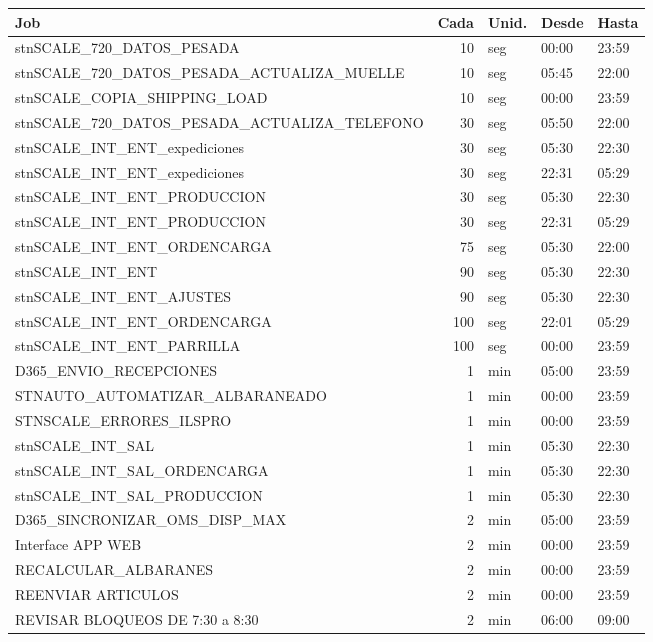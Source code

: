 \documentclass[11pt,a4paper]{article}
\begin{document}
\begin{longtable}{p{8.3cm}rp{1.2cm}p{1.5cm}p{1.5cm}}
\toprule
\textbf{Job} & \textbf{Cada} & \textbf{Unid.} & \textbf{Desde} & \textbf{Hasta} \\
\midrule
\endhead
stnSCALE\_720\_DATOS\_PESADA & 10 & seg & 00:00 & 23:59 \\
stnSCALE\_720\_DATOS\_PESADA\_ACTUALIZA\_MUELLE & 10 & seg & 05:45 & 22:00 \\
stnSCALE\_COPIA\_SHIPPING\_LOAD & 10 & seg & 00:00 & 23:59 \\
stnSCALE\_720\_DATOS\_PESADA\_ACTUALIZA\_TELEFONO & 30 & seg & 05:50 & 22:00 \\
stnSCALE\_INT\_ENT\_expediciones & 30 & seg & 05:30 & 22:30 \\
stnSCALE\_INT\_ENT\_expediciones & 30 & seg & 22:31 & 05:29 \\
stnSCALE\_INT\_ENT\_PRODUCCION & 30 & seg & 05:30 & 22:30 \\
stnSCALE\_INT\_ENT\_PRODUCCION & 30 & seg & 22:31 & 05:29 \\
stnSCALE\_INT\_ENT\_ORDENCARGA & 75 & seg & 05:30 & 22:00 \\
stnSCALE\_INT\_ENT & 90 & seg & 05:30 & 22:30 \\
stnSCALE\_INT\_ENT\_AJUSTES & 90 & seg & 05:30 & 22:30 \\
stnSCALE\_INT\_ENT\_ORDENCARGA & 100 & seg & 22:01 & 05:29 \\
stnSCALE\_INT\_ENT\_PARRILLA & 100 & seg & 00:00 & 23:59 \\
\midrule
D365\_ENVIO\_RECEPCIONES & 1 & min & 05:00 & 23:59 \\
STNAUTO\_AUTOMATIZAR\_ALBARANEADO & 1 & min & 00:00 & 23:59 \\
STNSCALE\_ERRORES\_ILSPRO & 1 & min & 00:00 & 23:59 \\
stnSCALE\_INT\_SAL & 1 & min & 05:30 & 22:30 \\
stnSCALE\_INT\_SAL\_ORDENCARGA & 1 & min & 05:30 & 22:30 \\
stnSCALE\_INT\_SAL\_PRODUCCION & 1 & min & 05:30 & 22:30 \\
D365\_SINCRONIZAR\_OMS\_DISP\_MAX & 2 & min & 05:00 & 23:59 \\
Interface APP WEB & 2 & min & 00:00 & 23:59 \\
RECALCULAR\_ALBARANES & 2 & min & 00:00 & 23:59 \\
REENVIAR ARTICULOS & 2 & min & 00:00 & 23:59 \\
REVISAR BLOQUEOS DE 7:30 a 8:30 & 2 & min & 06:00 & 09:00 \\

\end{longtable}
\end{document}
